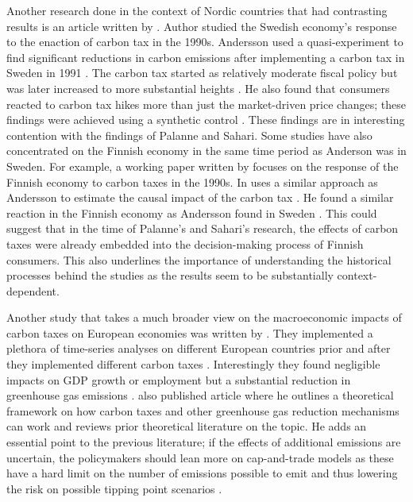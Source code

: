 \documentclass[
]{article}
\begin{document}
Another research done in the context of Nordic countries that had contrasting results is an article written by \citet{andersson2019}. Author studied the Swedish economy's response to the enaction of carbon tax in the 1990s. Andersson used a quasi-experiment to find significant reductions in carbon emissions after implementing a carbon tax in Sweden in 1991 \citep{andersson2019}. The carbon tax started as relatively moderate fiscal policy but was later increased to more substantial heights \citep{andersson2019}. He also found that consumers reacted to carbon tax hikes more than just the market-driven price changes; these findings were achieved using a synthetic control \citep{andersson2019}. These findings are in interesting contention with the findings of Palanne and Sahari. Some studies have also concentrated on the Finnish economy in the same time period as Anderson was in Sweden. For example, a working paper written by \citet{elbaum2021} focuses on the response of the Finnish economy to carbon taxes in the 1990s. In uses a similar approach as Andersson to estimate the causal impact of the carbon tax \citep{elbaum2021}. He found a similar reaction in the Finnish economy as Andersson found in Sweden \citep{elbaum2021}. This could suggest that in the time of Palanne's and Sahari's research, the effects of carbon taxes were already embedded into the decision-making process of Finnish consumers. This also underlines the importance of understanding the historical processes behind the studies as the results seem to be substantially context-dependent.

Another study that takes a much broader view on the macroeconomic impacts of carbon taxes on European economies was written by \citet{metcalf2020}. They implemented a plethora of time-series analyses on different European countries prior and after they implemented different carbon taxes \citep{metcalf2020}. Interestingly they found negligible impacts on GDP growth or employment but a substantial reduction in greenhouse gas emissions \citep{metcalf2020}. \citet{metcalf2021} also published article where he outlines a theoretical framework on how carbon taxes and other greenhouse gas reduction mechanisms can work and reviews prior theoretical literature on the topic. He adds an essential point to the previous literature; if the effects of additional emissions are uncertain, the policymakers should lean more on cap-and-trade models as these have a hard limit on the number of emissions possible to emit and thus lowering the risk on possible tipping point scenarios \citep{metcalf2021}.
\end{document}
